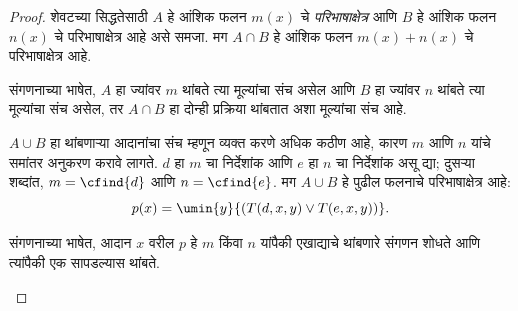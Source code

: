 \documentclass[../../../include/open-logic-section]{subfiles}
\begin{document}
\begin{proof}
शेवटच्या सिद्धतेसाठी $A$ हे आंशिक फलन $m(x)$ चे
\emph{परिभाषाक्षेत्र} आणि $B$ हे आंशिक फलन $n(x)$ चे
परिभाषाक्षेत्र आहे असे समजा. मग $A \cap B$ हे आंशिक फलन
$m(x) +
n(x)$ चे परिभाषाक्षेत्र आहे.

\begin{explain}
संगणनाच्या भाषेत, $A$ हा ज्यांवर $m$ थांबते त्या
मूल्यांचा संच असेल आणि $B$ हा ज्यांवर $n$ थांबते त्या
मूल्यांचा संच असेल, तर $A \cap B$ हा दोन्ही प्रक्रिया
थांबतात अशा मूल्यांचा संच आहे.
\end{explain}

$A \cup B$ हा थांबणाऱ्या आदानांचा संच म्हणून व्यक्त करणे
अधिक कठीण आहे, कारण $m$ आणि $n$ यांचे समांतर अनुकरण
करावे लागते. $d$ हा $m$ चा निर्देशांक आणि $e$ हा $n$
चा निर्देशांक असू द्या; दुसऱ्या शब्दांत, $m =
\cfind{d}$ आणि $n = \cfind{e}$. मग $A \cup B$ हे
पुढील फलनाचे परिभाषाक्षेत्र आहे:
\[
p(x) = \umin{y}{(T(d,x,y) \lor T(e,x,y))}.
\]
\begin{explain}
संगणनाच्या भाषेत, आदान $x$ वरील $p$ हे $m$ किंवा
$n$ यांपैकी एखाद्याचे थांबणारे संगणन शोधते आणि त्यांपैकी
एक सापडल्यास थांबते.
\end{explain}
\end{proof}
\end{document}
